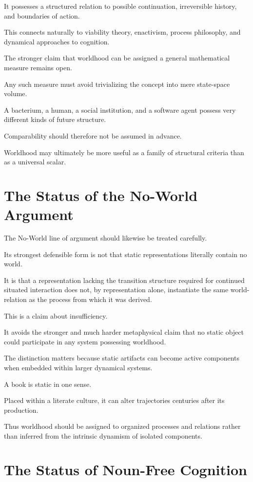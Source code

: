 \documentclass[11pt]{article}
\theoremstyle{remark}
\begin{document}
It possesses a structured relation to possible continuation, irreversible
history, and boundaries of action.

This connects naturally to viability theory, enactivism, process philosophy,
and dynamical approaches to cognition.

The stronger claim that worldhood can be assigned a general mathematical
measure remains open.

Any such measure must avoid trivializing the concept into mere state-space
volume.

A bacterium, a human, a social institution, and a software agent possess very
different kinds of future structure.

Comparability should therefore not be assumed in advance.

Worldhood may ultimately be more useful as a family of structural criteria than
as a universal scalar.

\section{The Status of the No-World Argument}

The No-World line of argument should likewise be treated carefully.

Its strongest defensible form is not that static representations literally
contain no world.

It is that a representation lacking the transition structure required for
continued situated interaction does not, by representation alone, instantiate
the same world-relation as the process from which it was derived.

This is a claim about insufficiency.

It avoids the stronger and much harder metaphysical claim that no static object
could participate in any system possessing worldhood.

The distinction matters because static artifacts can become active components
when embedded within larger dynamical systems.

A book is static in one sense.

Placed within a literate culture, it can alter trajectories centuries after its
production.

Thus worldhood should be assigned to organized processes and relations rather
than inferred from the intrinsic dynamism of isolated components.

\section{The Status of Noun-Free Cognition}
\end{document}
